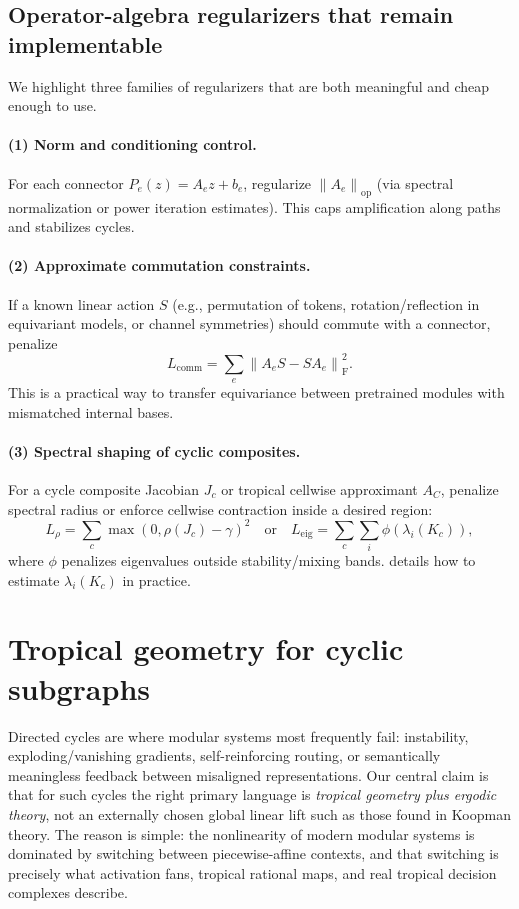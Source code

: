 \documentclass[11pt]{article}
\theoremstyle{definition}
\theoremstyle{plain}
\theoremstyle{remark}
\newcommand{\opnorm}[1]{\left\lVert #1 \right\rVert_{\mathrm{op}}}
\newcommand{\Frob}[1]{\left\lVert #1 \right\rVert_{\mathrm{F}}}
\begin{document}
\subsection{Operator-algebra regularizers that remain implementable}
We highlight three families of regularizers that are both meaningful and cheap enough to use.

\paragraph{(1) Norm and conditioning control.}
For each connector $P_e(z)=A_e z+b_e$, regularize $\opnorm{A_e}$ (via spectral normalization or power iteration estimates).
This caps amplification along paths and stabilizes cycles.

\paragraph{(2) Approximate commutation constraints.}
If a known linear action $S$ (e.g., permutation of tokens, rotation/reflection in equivariant models, or channel symmetries) should commute with a connector, penalize
\[
L_{\mathrm{comm}}=\sum_e \Frob{A_e S - S A_e}^2.
\]
This is a practical way to transfer equivariance between pretrained modules with mismatched internal bases.

\paragraph{(3) Spectral shaping of cyclic composites.}
For a cycle composite Jacobian $J_c$ or tropical cellwise approximant $A_C$, penalize spectral radius or enforce cellwise contraction inside a desired region:
\[
L_{\rho} = \sum_c \max(0,\rho(J_c)-\gamma)^2
\quad\text{or}\quad
L_{\mathrm{eig}}=\sum_c \sum_{i} \phi(\lambda_i(K_c)),
\]
where $\phi$ penalizes eigenvalues outside stability/mixing bands.
 details how to estimate $\lambda_i(K_c)$ in practice.

\newpage

\section{Tropical geometry for cyclic subgraphs}
\label{sec:tropical-cycle-dynamics}

Directed cycles are where modular systems most frequently fail: instability, exploding/vanishing gradients, self-reinforcing routing, or semantically meaningless feedback between misaligned representations.
Our central claim is that for such cycles the right primary language is \emph{tropical geometry plus ergodic theory}, not an externally chosen global linear lift such as those found in Koopman theory.
The reason is simple:
the nonlinearity of modern modular systems is dominated by switching between piecewise-affine contexts, and that switching is precisely what activation fans, tropical rational maps, and real tropical decision complexes describe.
\end{document}
